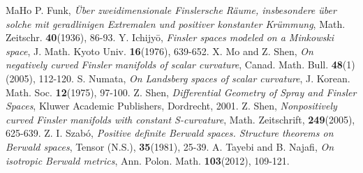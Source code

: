 \documentclass[12pt,a4paper]{article}
\theoremstyle{definition}
\numberwithin{equation}{section}
\begin{document}
\begin{thebibliography}{MaHo}
 P. Funk, {\it \"{U}ber zweidimensionale Finslersche R\"{a}ume, insbesondere \"{u}ber solche mit geradlinigen Extremalen und positiver konstanter Kr\"{u}mmung}, Math. Zeitschr. {\bf 40}(1936), 86-93.
 Y. Ichijy\={o}, {\it Finsler spaces modeled on a Minkowski space}, J. Math. Kyoto Univ. {\bf 16}(1976), 639-652.
 X. Mo and Z. Shen, {\it On negatively curved Finsler manifolds of scalar curvature}, Canad. Math. Bull. {\bf 48}(1) (2005), 112-120.
 S. Numata, {\it On Landsberg spaces of scalar curvature}, J. Korean. Math. Soc. {\bf 12}(1975), 97-100.
 Z. Shen, {\it Differential Geometry of Spray and Finsler Spaces}, Kluwer Academic Publishers,  Dordrecht,  2001.
 Z. Shen, {\it Nonpositively curved Finsler manifolds with constant S-curvature}, Math. Zeitschrift, {\bf 249}(2005), 625-639.
 Z. I. Szab\'{o}, {\it Positive definite Berwald spaces. Structure theorems on Berwald spaces}, Tensor (N.S.), {\bf 35}(1981), 25-39.
 A. Tayebi and B. Najafi, {\it  On isotropic Berwald metrics}, Ann. Polon. Math. {\bf 103}(2012), 109-121.

\end{thebibliography}
\end{document}
